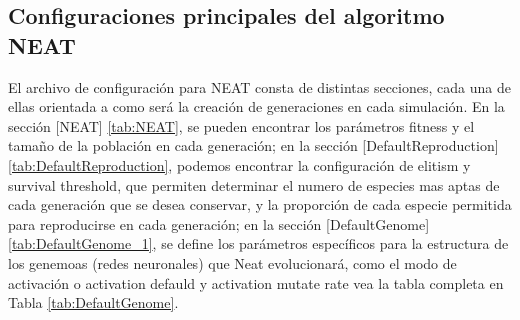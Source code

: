 \documentclass[conference]{IEEEtran}
\begin{document}
\subsection{Configuraciones principales del algoritmo NEAT}
El archivo de configuración para NEAT consta de distintas secciones, cada una de ellas orientada a como será la creación de generaciones en cada simulación. En la sección [NEAT] \ref{tab:NEAT}, se pueden encontrar los parámetros fitness y el tamaño de la población en cada generación; en la sección [DefaultReproduction] \ref{tab:DefaultReproduction}, podemos encontrar la configuración de elitism y survival threshold, que permiten determinar el numero de especies mas aptas de cada generación que se desea conservar, y la proporción de cada especie permitida para reproducirse en cada generación; en la sección [DefaultGenome] \ref{tab:DefaultGenome_1}, se define los parámetros específicos para la estructura de los genemoas (redes neuronales) que Neat evolucionará, como el modo de activación o activation defauld y activation mutate rate vea la tabla completa en Tabla \ref{tab:DefaultGenome}.
\end{document}
